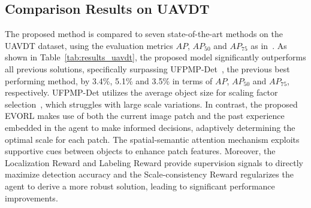 \documentclass[letterpaper]{article} %
\begin{document}
\subsection{Comparison Results on UAVDT}
\label{sssec:uavdt}
The proposed method is compared %
to seven state-of-the-art methods on the UAVDT dataset, %
using the evaluation metrics ${AP}$, ${AP_{50}}$ and ${AP_{75}}$ as in~\cite{Huang_2022_UFPMP, Xu_2022_AdaZoom}. As shown in Table~\ref{tab:results_uavdt}, the proposed model significantly %
outperforms all previous solutions, specifically surpassing UFPMP-Det~\cite{Huang_2022_UFPMP}, the previous best performing method, by 3.4\%, 5.1\% and 3.5\% in terms of ${AP}$, ${AP_{50}}$ and ${AP_{75}}$, respectively. UFPMP-Det utilizes the average object size %
for scaling factor selection~\cite{Huang_2022_UFPMP}, which struggles with large scale variations. In contrast, the proposed EVORL makes use of both the current image patch and the past experience embedded in the agent to make %
informed decisions, adaptively determining the optimal scale for each patch. The spatial-semantic attention mechanism exploits supportive cues between objects to enhance patch features. Moreover, the Localization Reward and Labeling Reward provide supervision signals to directly maximize detection accuracy and the Scale-consistency Reward regularizes the agent to derive a more robust solution, %
leading to significant performance improvements.
\end{document}
